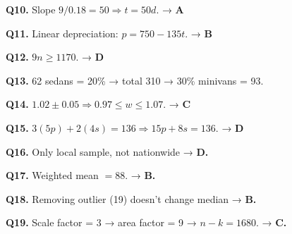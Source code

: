 \documentclass[12pt]{article}
\begin{document}
\textbf{Q10.} Slope \(9/0.18 = 50 \Rightarrow t=50d.\) → \textbf{A}

\textbf{Q11.} Linear depreciation: \(p = 750 - 135t.\) → \textbf{B}

\textbf{Q12.} \(9n \ge 1170.\) → \textbf{D}

\textbf{Q13.} 62 sedans = 20\% → total 310 → 30\% minivans = 93.

\textbf{Q14.} \(1.02 \pm 0.05 \Rightarrow 0.97 \le w \le 1.07.\) → \textbf{C}

\textbf{Q15.} \(3(5p)+2(4s)=136 \Rightarrow 15p+8s=136.\) → \textbf{D}

\textbf{Q16.} Only local sample, not nationwide → \textbf{D.}

\textbf{Q17.} Weighted mean \(=88.\) → \textbf{B.}

\textbf{Q18.} Removing outlier (19) doesn’t change median → \textbf{B.}

\textbf{Q19.} Scale factor = 3 → area factor = 9 → \(n-k=1680.\) → \textbf{C.}
\end{document}
